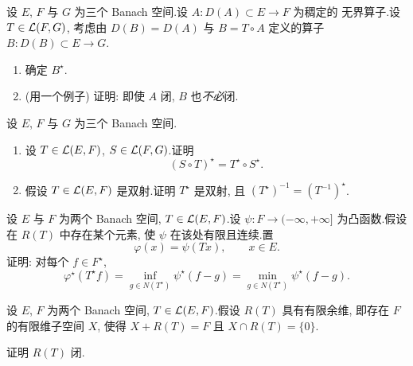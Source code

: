 \begin{exercise}
\label{exer:2.24}
设 $E$, $F$ 与 $G$ 为三个 Banach 空间.设 $A:D(A)\subset E\to F$ 为稠定的
无界算子.设 $T\in\mathcal{L}(F,G)$, 考虑由 $D(B)=D(A)$ 与 $B=T\circ A$ 定义的算子
$B:D(B)\subset E\to G$.

\begin{enumerate}[label=\arabic*., leftmargin=2.2em, itemsep=0.25em]
	\item 确定 $B^\star$.
	\item (用一个例子) 证明: 即使 $A$ 闭, $B$ 也\emph{不必}闭.
\end{enumerate}
\end{exercise}

\begin{exercise}
\label{exer:2.25}
设 $E$, $F$ 与 $G$ 为三个 Banach 空间.

\begin{enumerate}[label=\arabic*., leftmargin=2.2em, itemsep=0.25em]
	\item 设 $T\in\mathcal{L}(E,F)$, $S\in\mathcal{L}(F,G)$.证明
	      \begin{equation*}
	      (S\circ T)^\star=T^\star\circ S^\star.
	      \end{equation*}
	\item 假设 $T\in\mathcal{L}(E,F)$ 是双射.证明 $T^\star$ 是双射, 且
	      $(T^\star)^{-1}=(T^{-1})^\star$.
\end{enumerate}
\end{exercise}

\begin{exercise}
\label{exer:2.26}
设 $E$ 与 $F$ 为两个 Banach 空间, $T\in\mathcal{L}(E,F)$.设
$\psi:F\to(-\infty,+\infty]$ 为凸函数.假设在 $R(T)$ 中存在某个元素, 使 $\psi$
在该处有限且连续.置
\begin{equation*}
\varphi(x)=\psi(Tx),\qquad x\in E.
\end{equation*}
证明: 对每个 $f\in F^\star$,
\begin{equation*}
\varphi^\star(T^\star f)
=\inf_{g\in N(T^\star)}\psi^\star(f-g)
=\min_{g\in N(T^\star)}\psi^\star(f-g).
\end{equation*}
\end{exercise}

\begin{exercise}
\label{exer:2.27}
设 $E$, $F$ 为两个 Banach 空间, $T\in\mathcal{L}(E,F)$.假设 $R(T)$ 具有有限余维,
即存在 $F$ 的有限维子空间 $X$, 使得 $X+R(T)=F$ 且 $X\cap R(T)=\{0\}$.

证明 $R(T)$ 闭.
\end{exercise}
